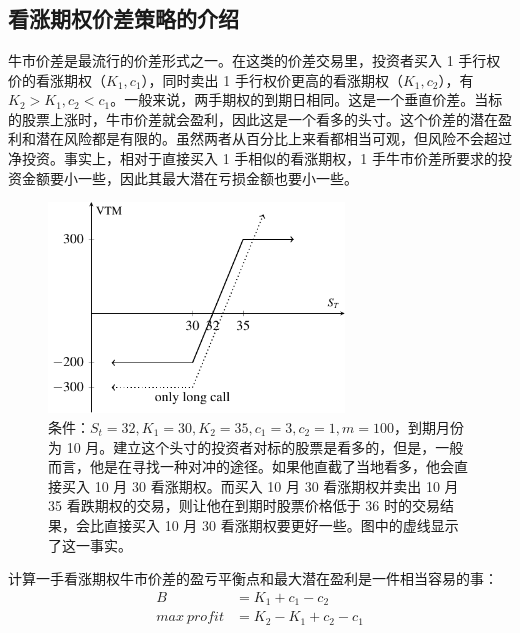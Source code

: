 
\chapter{}


\section{看涨期权价差策略的介绍}
牛市价差是最流行的价差形式之一。在这类的价差交易里，投资者买入 1 手行权价的看涨期权（$K_1, c_1$），同时卖出 1 手行权价更高的看涨期权（$K_1, c_2$），有 $K_2>K_1, c_2<c_1$。一般来说，两手期权的到期日相同。这是一个垂直价差。当标的股票上涨时，牛市价差就会盈利，因此这是一个看多的头寸。这个价差的潜在盈利和潜在风险都是有限的。虽然两者从百分比上来看都相当可观，但风险不会超过净投资。事实上，相对于直接买入 1 手相似的看涨期权，1 手牛市价差所要求的投资金额要小一些，因此其最大潜在亏损金额也要小一些。

\begin{figure}[h]
    \centering
    \includegraphics[width=0.7\textwidth]{IMG/call_spread_1.pdf}
    \caption{条件：$S_t=32, K_1=30, K_2=35, c_1=3, c_2=1, m=100$，到期月份为 10 月。建立这个头寸的投资者对标的股票是看多的，但是，一般而言，他是在寻找一种对冲的途径。如果他直截了当地看多，他会直接买入 10 月 30 看涨期权。而买入 10 月 30 看涨期权并卖出 10 月 35 看跌期权的交易，则让他在到期时股票价格低于 36 时的交易结果，会比直接买入 10 月 30 看涨期权要更好一些。图中的虚线显示了这一事实。}
    \label{fig:call_spread}
\end{figure}

计算一手看涨期权牛市价差的盈亏平衡点和最大潜在盈利是一件相当容易的事：
\begin{equation}
    \begin{aligned}
        B          & =K_1+c_1-c_2     \\
        max~profit & =K_2-K_1+c_2-c_1 \\
    \end{aligned}
\end{equation}
